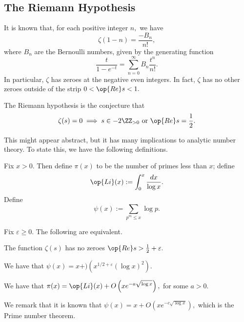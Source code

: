 \documentclass[../notes.tex]{subfiles}
\begin{document}
\subsection{The Riemann Hypothesis}
It is known that, for each positive integer $n,$ we have
\[\zeta(1-n)=\frac{-B_n}{n!},\]
where $B_n$ are the Bernoulli numbers, given by the generating function
\[\frac{t}{1-e^{-t}}=\sum_{n=0}^\infty B_n\frac{t^n}{n!}.\]
In particular, $\zeta$ has zeroes at the negative even integers. In fact, $\zeta$ has no other zeroes outside of the strip $0<\op{Re}s<1.$ 
\begin{conj}
	The Riemann hypothesis is the conjecture that
	\[\zeta(s)=0\implies s\in-2\ZZ_{>0}\text{ or }\op{Re}s=\frac12.\]
\end{conj}
This might appear abstract, but it has many implications to analytic number theory. To state this, we have the following definitions.
\begin{definition}
	Fix $x>0.$ Then define $\pi(x)$ to be the number of primes less than $x$; define
	\[\op{Li}(x):=\int_0^x\frac{dx}{\log x}.\]
	Define
	\[\psi(x):=\sum_{p^m\le x}\log p.\]
\end{definition}
\begin{theorem}
	Fix $\varepsilon\ge0.$ The following are equivalent.
	\begin{listroman}
		\item The function $\zeta(s)$ has no zeroes $\op{Re}s>\frac12+\varepsilon.$
		\item We have that $\psi(x)=x+)\left(x^{1/2+\varepsilon}(\log x)^2\right).$
		\item We have that $\pi(x)=\op{Li}(x)+O\left(xe^{-a\sqrt{\log x}}\right),$ for some $a>0.$
	\end{listroman}
\end{theorem}
We remark that it is known that $\psi(x)=x+O\left(xe^{-c\sqrt{\log x}}\right),$ which is the Prime number theorem.
\end{document}
